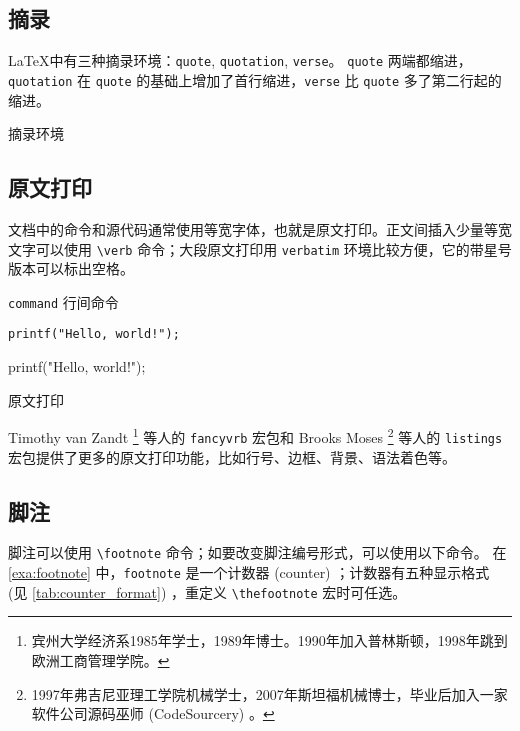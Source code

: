 \subsection{摘录}

\LaTeX 中有三种摘录环境：\texttt{quote}, \texttt{quotation}, \texttt{verse}。 \texttt{quote} 两端都缩进， \texttt{quotation} 在 \texttt{quote} 的基础上增加了首行缩进，\texttt{verse} 比 \texttt{quote} 多了第二行起的缩进。

\begin{example}[h]
\caption{摘录环境}
\end{example}

\subsection{原文打印}
文档中的命令和源代码通常使用等宽字体，也就是原文打印。正文间插入少量等宽文字可以使用 \verb|\verb| 命令；大段原文打印用 \texttt{verbatim} 环境比较方便，它的带星号版本可以标出空格。

\begin{example}[h]
\begin{RLDemo}[numbers=left]
\verb|command| 行间命令
\begin{verbatim}
printf("Hello, world!");
\end{verbatim}
\begin{verbatim*}
printf("Hello, world!");
\end{verbatim*}
\end{RLDemo}
\caption{原文打印}
\end{example}

Timothy van Zandt\indexVanZandt{} \footnote{宾州大学经济系1985年学士，1989年博士。1990年加入普林斯顿，1998年跳到欧洲工商管理学院。} 等人的 \texttt{fancyvrb} 宏包\citep{Zandt_fancyvrb}和 Brooks Moses\indexMoses{} \footnote{1997年弗吉尼亚理工学院机械学士，2007年斯坦福机械博士，毕业后加入一家软件公司源码巫师 (CodeSourcery) 。} 等人的 \texttt{listings} 宏包\citep{Moses_listings}提供了更多的原文打印功能，比如行号、边框、背景、语法着色等。

\subsection{脚注}

脚注可以使用 \verb|\footnote| 命令；如要改变脚注编号形式，可以使用以下命令。
在 \autoref{exa:footnote} 中，\verb|footnote| 是一个计数器 (counter) ；计数器有五种显示格式 (见 \autoref{tab:counter_format}) ，重定义 \verb|\thefootnote| 宏时可任选。

